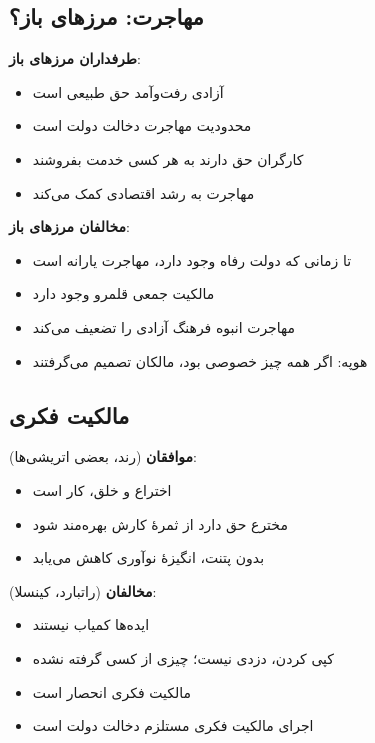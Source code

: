 \subsection{مهاجرت: مرزهای باز؟}


\noindent{}

\textbf{طرفداران مرزهای باز}:
\begin{itemize}[itemsep=1.5ex, leftmargin=*, topsep=0.5ex]
    \item آزادی رفت‌وآمد حق طبیعی است
    \item محدودیت مهاجرت دخالت دولت است
    \item کارگران حق دارند به هر کسی خدمت بفروشند
    \item مهاجرت به رشد اقتصادی کمک می‌کند
\end{itemize}



\textbf{مخالفان مرزهای باز}:
\begin{itemize}[itemsep=1.5ex, leftmargin=*, topsep=0.5ex]
    \item تا زمانی که دولت رفاه وجود دارد، مهاجرت یارانه است
    \item مالکیت جمعی قلمرو وجود دارد
    \item مهاجرت انبوه فرهنگ آزادی را تضعیف می‌کند
    \item هوپه: اگر همه چیز خصوصی بود، مالکان تصمیم می‌گرفتند
\end{itemize}

\subsection{مالکیت فکری}


\noindent{}

\textbf{موافقان} (رند، بعضی اتریشی‌ها):
\begin{itemize}[itemsep=1.5ex, leftmargin=*, topsep=0.5ex]
    \item اختراع و خلق، کار است
    \item مخترع حق دارد از ثمرهٔ کارش بهره‌مند شود
    \item بدون پتنت، انگیزهٔ نوآوری کاهش می‌یابد
\end{itemize}



\textbf{مخالفان} (راتبارد، کینسلا):
\begin{itemize}[itemsep=1.5ex, leftmargin=*, topsep=0.5ex]
    \item ایده‌ها کمیاب نیستند
    \item کپی کردن، دزدی نیست؛ چیزی از کسی گرفته نشده
    \item مالکیت فکری انحصار است
    \item اجرای مالکیت فکری مستلزم دخالت دولت است
\end{itemize}

